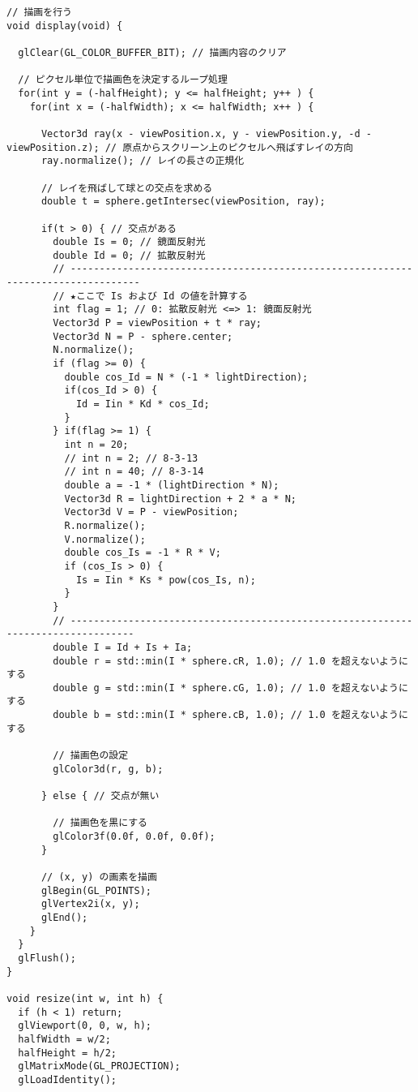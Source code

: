 \documentclass{scrartcl}
\begin{document}
\begin{verbatim}
// 描画を行う
void display(void) {

  glClear(GL_COLOR_BUFFER_BIT); // 描画内容のクリア

  // ピクセル単位で描画色を決定するループ処理
  for(int y = (-halfHeight); y <= halfHeight; y++ ) {
    for(int x = (-halfWidth); x <= halfWidth; x++ ) {

      Vector3d ray(x - viewPosition.x, y - viewPosition.y, -d - viewPosition.z); // 原点からスクリーン上のピクセルへ飛ばすレイの方向
      ray.normalize(); // レイの長さの正規化

      // レイを飛ばして球との交点を求める
      double t = sphere.getIntersec(viewPosition, ray);

      if(t > 0) { // 交点がある
        double Is = 0; // 鏡面反射光
        double Id = 0; // 拡散反射光
        // ----------------------------------------------------------------------------------
        // ★ここで Is および Id の値を計算する
        int flag = 1; // 0: 拡散反射光 <=> 1: 鏡面反射光
        Vector3d P = viewPosition + t * ray;
        Vector3d N = P - sphere.center;
        N.normalize();
        if (flag >= 0) {
          double cos_Id = N * (-1 * lightDirection);
          if(cos_Id > 0) {
            Id = Iin * Kd * cos_Id;
          }
        } if(flag >= 1) {
          int n = 20;
          // int n = 2; // 8-3-13
          // int n = 40; // 8-3-14
          double a = -1 * (lightDirection * N);
          Vector3d R = lightDirection + 2 * a * N;
          Vector3d V = P - viewPosition;
          R.normalize();
          V.normalize();
          double cos_Is = -1 * R * V;
          if (cos_Is > 0) {
            Is = Iin * Ks * pow(cos_Is, n);
          }
        }
        // ---------------------------------------------------------------------------------
        double I = Id + Is + Ia;
        double r = std::min(I * sphere.cR, 1.0); // 1.0 を超えないようにする
        double g = std::min(I * sphere.cG, 1.0); // 1.0 を超えないようにする
        double b = std::min(I * sphere.cB, 1.0); // 1.0 を超えないようにする

        // 描画色の設定
        glColor3d(r, g, b);

      } else { // 交点が無い

        // 描画色を黒にする
        glColor3f(0.0f, 0.0f, 0.0f);
      }

      // (x, y) の画素を描画
      glBegin(GL_POINTS);
      glVertex2i(x, y);
      glEnd();
    }
  }
  glFlush();
}

void resize(int w, int h) {
  if (h < 1) return;
  glViewport(0, 0, w, h);
  halfWidth = w/2;
  halfHeight = h/2;
  glMatrixMode(GL_PROJECTION);
  glLoadIdentity();


\end{verbatim}
\end{document}
